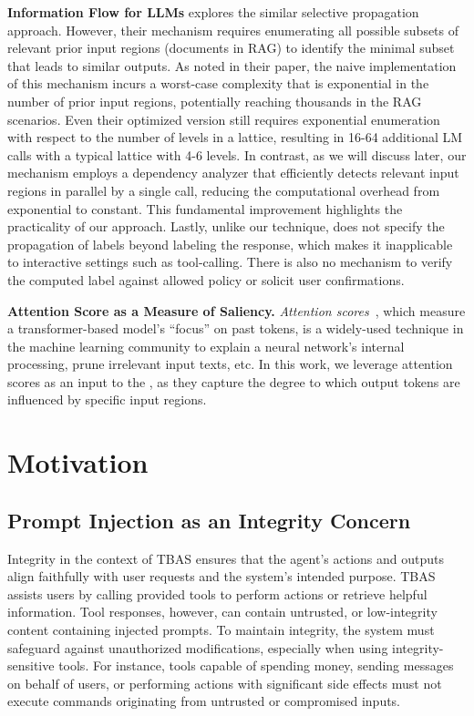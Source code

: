 \textbf{Information Flow for LLMs} 
\cite{siddiqui2024permissiveinformationflowanalysislarge} explores the similar selective propagation approach. However,  their mechanism requires enumerating all possible subsets of relevant prior input regions (documents in RAG) to identify the minimal subset that leads to similar outputs. As noted in their paper, the naive implementation of this mechanism incurs a worst-case complexity that is exponential in the number of prior input regions, potentially reaching thousands in the RAG scenarios. Even their optimized version still requires exponential enumeration with respect to the number of levels in a lattice, resulting in 16-64 additional LM calls with a typical lattice with 4-6 levels. In contrast, as we will discuss later, our mechanism employs a dependency analyzer that efficiently detects relevant input regions in parallel by a single call, reducing the computational overhead from exponential to constant. This fundamental improvement highlights the practicality of our approach. Lastly, unlike our technique, \cite{siddiqui2024permissiveinformationflowanalysislarge} does not specify the propagation of labels beyond labeling the response, which makes it inapplicable to interactive settings such as tool-calling. There is also no mechanism to verify the computed label against allowed policy or solicit user confirmations. 


\textbf{Attention Score as a Measure of Saliency.}
\textit{Attention scores}~\cite{vaswani2017attention,wiegreffe2019attention}, which measure a transformer-based model's ``focus'' on past tokens, is a widely-used technique in the machine learning community to explain a neural network's internal processing\cite{jain2019attention,wang2023label}, prune irrelevant input texts\cite{zhang2023h2o}, etc.  In this work, we leverage attention scores as an input to the \dependencydetector, as they capture the degree to which output tokens are influenced by specific input regions.

\section{Motivation}

\subsection{Prompt Injection as an Integrity Concern} \label{subsec:prompt_inj_integrity}
Integrity in the context of TBAS ensures that the agent’s actions and outputs align faithfully with user requests and the system’s intended purpose. TBAS assists users by calling provided tools to perform actions or retrieve helpful information. Tool responses, however, can contain untrusted, or low-integrity content containing injected prompts. To maintain integrity, the system must safeguard against unauthorized modifications, especially when using integrity-sensitive tools. For instance, tools capable of spending money, sending messages on behalf of users, or performing actions with significant side effects must not execute commands originating from untrusted or compromised inputs.


